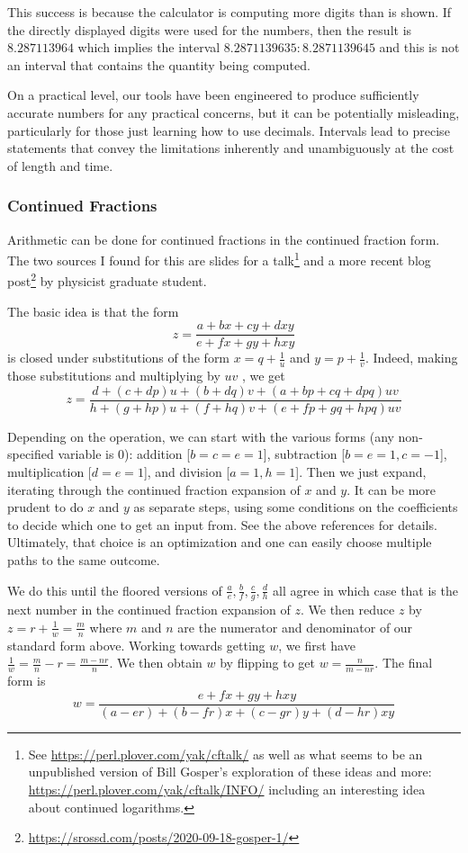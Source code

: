 \documentclass[12pt]{article}
\begin{document}
This success is because the calculator is computing more digits than is shown. If the directly displayed digits were used for the numbers, then the result is $8.287113964$ which implies the interval $8.2871139635:8.2871139645$ and this is not an interval that contains the quantity being computed. 

On a practical level, our tools have been engineered to produce sufficiently accurate numbers for any practical concerns, but it can be potentially misleading, particularly for those just learning how to use decimals. Intervals lead to precise statements that convey the limitations inherently and unambiguously at the cost of length and time.  


\subsubsection{Continued Fractions}\label{sec:con-frac}

Arithmetic can be done for continued fractions in the continued fraction form. The two sources I found for this are slides for a talk\footnote{See \url{https://perl.plover.com/yak/cftalk/} as well as what seems to be an unpublished version of Bill Gosper's exploration of these ideas and more: \url{https://perl.plover.com/yak/cftalk/INFO/} including an interesting idea about continued logarithms.} and a more recent blog post\footnote{\url{https://srossd.com/posts/2020-09-18-gosper-1/}} by physicist graduate student. 

The basic idea is that the form $$z = \frac{a +bx + cy + dxy}{e + fx + gy + hxy}$$ is closed under substitutions of the form $x = q + \frac{1}{u}$ and $y = p + \frac{1}{v}$. Indeed, making those substitutions and multiplying by $uv$ , we get 
$$z = \frac{d + (c+d p) u + (b+dq)v + (a+bp + cq + dpq)uv}{h + (g+hp)u + (f+hq)v + (e+fp+ gq + hpq)uv}$$

Depending on the operation, we can start with the various forms (any non-specified variable is 0): addition [$b=c=e=1$], subtraction [$b=e=1, c=-1$], multiplication [$d=e=1$], and division [$a=1,h=1$]. Then we just expand, iterating through the continued fraction expansion of $x$ and $y$. It can be more prudent to do $x$ and $y$ as separate steps, using some conditions on the coefficients to decide which one to get an input from. See the above references for details. Ultimately, that choice is an optimization and one can easily choose multiple paths to the same outcome. 

We do this until the floored versions of $\frac{a}{e}, \frac{b}{f}, \frac{c}{g}, \frac{d}{h}$ all agree in which case that is the next number in the continued fraction expansion of $z$. We then reduce $z$ by $z = r + \frac{1}{w} = \frac{m}{n}$ where $m$ and $n$ are the numerator and denominator of our standard form above. Working towards getting $w$, we first have $\frac{1}{w} = \frac{m}{n} - r = \frac{m-nr}{n}$. We then obtain $w$ by flipping to get $w = \frac{n}{m-nr}$. The final form is 
$$w =  \frac{e + fx + gy + hxy}{(a-er) + (b-fr)x + (c-gr) y + (d-hr)xy}$$
\end{document}
